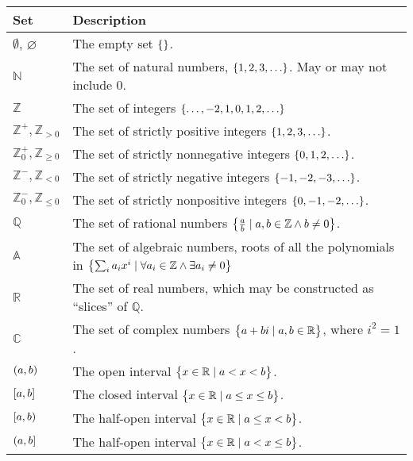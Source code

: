 \documentclass[fleqn,a4paper,11pt]{article}
\begin{document}
    \begin{longtable}{ll}
    \toprule
    \bfseries Set & \bfseries Description \\
    \midrule
    \endhead
    \(\emptyset\), \(\varnothing\) & The empty set \(\set{}\). \\
    \(\mathbb{N}\) & The set of natural numbers, \(\set{1, 2, 3, \ldots}\).
                   May or may not include \(0\). \\
    \(\mathbb{Z}\) & The set of integers \(\set{\ldots, -2, 1, 0, 1, 2, \ldots}\) \\
    \(\mathbb{Z}^+, \mathbb{Z}_{> 0}\) & The set of strictly positive integers
                   \(\set{1, 2, 3, \ldots}\). \\
    \(\mathbb{Z}^+_0, \mathbb{Z}_{\ge 0}\) &
                   The set of strictly nonnegative integers
                   \(\set{0, 1, 2, \ldots}\). \\
    \(\mathbb{Z}^-, \mathbb{Z}_{< 0}\) & The set of strictly negative integers
                   \(\set{-1, -2, -3, \ldots}\). \\
    \(\mathbb{Z}^-_0, \mathbb{Z}_{\le 0}\) &
                   The set of strictly nonpositive integers
                   \(\set{0, -1, -2, \ldots}\). \\
    \(\mathbb{Q}\) & The set of rational numbers
                   \(\set{\frac ab \mid a, b \in \mathbb{Z} \land b \neq 0}\).\\
    \(\mathbb{A}\) & The set of algebraic numbers, roots of all the polynomials in
                   \(\set{\sum_i a_i x^i \mid \forall a_i \in \mathbb{Z} \land
                         \exists a_i \neq 0}\) \\
    \(\mathbb{R}\) & The set of real numbers, which may be constructed as
                   ``slices'' of \(\mathbb{Q}\). \\
    \(\mathbb{C}\) & The set of complex numbers
                   \(\set{a + bi \mid a, b \in \mathbb{R}}\), where \(i^2 = 1\).\\
    \(\intoo{a, b}\) & The open interval
                     \(\set{x \in \mathbb{R} \mid a < x < b}\).\\
    \(\intcc{a, b}\) & The closed interval
                     \(\set{x \in \mathbb{R} \mid a \le x \le b}\).\\
    \(\intco{a, b}\) & The half-open interval
                     \(\set{x \in \mathbb{R} \mid a \le x < b}\).\\
    \(\intoc{a, b}\) & The half-open interval
                     \(\set{x \in \mathbb{R} \mid a < x \le b}\).\\
    \bottomrule
    \end{longtable}
\end{document}

